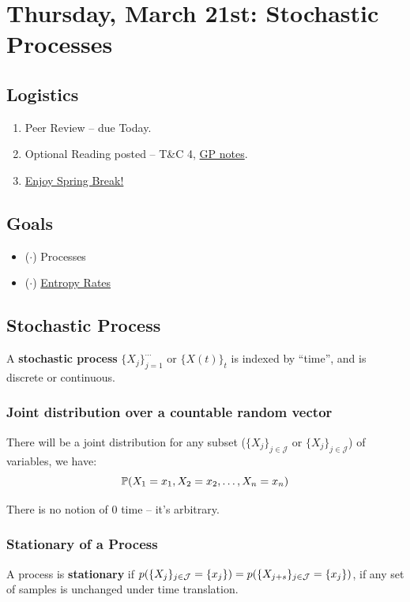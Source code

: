 \section{Thursday, March 21st: Stochastic Processes}
\subsection{Logistics}
\begin{enumerate}
    \item Peer Review -- due Today.
    \item Optional Reading posted -- T\&C 4, \underline{GP notes}.
    \item \underline{Enjoy Spring Break!}
\end{enumerate}

\subsection{Goals}
\begin{itemize}
    \item ($\cdot$) Processes
    \item ($\cdot$) \underline{Entropy Rates}
\end{itemize}

\subsection{Stochastic Process}
\begin{shaded}
A \textbf{stochastic process} $\{X_j\}_{j=1}^{\cdots}$ or $\{X(t)\}_{t}$ is indexed by ``time'', and is discrete or continuous.
\end{shaded}

\subsubsection{Joint distribution over a countable random vector}
There will be a joint distribution for any subset ($\{X_j\}_{j\in\mathcal{J}}$ or $\{X_j\}_{j\in\mathcal{J}}$) of variables, we have:
\begin{equation}
    \P(X_1=x_1,X_2=x_2, \ldots, X_n=x_n)
\end{equation}

There is no notion of 0 time -- it's arbitrary.

\subsubsection{Stationary of a Process}
\begin{shaded}
A process is \textbf{stationary} if $p(\{X_j\}_{j\in\mathcal{J}}=\{x_j\})=p(\{X_{j+s}\}_{j\in\cJ} = \{x_j\})$, if any set of samples is unchanged under time translation.
\end{shaded}

